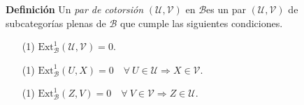 \documentclass[preview]{standalone}
\begin{document}
\begin{center}
\justifying \textbf{Definición} Un \emph{par de cotorsión} $(\mathcal{U}, \mathcal{V})$ en $\mathscr{B}$es un par $(\mathcal{U}, \mathcal{V})$ de subcategorías plenas de $\mathscr{B}$ que cumple las siguientes condiciones.\begin{enumerate} \item[(1)] $\text{Ext}^1_\mathscr{B} (\mathcal{U}, \mathcal{V}) = 0$. \item[(1)] $\text{Ext}^1_\mathscr{B} (U, X) = 0 \quad \forall \ U\in\mathcal{U} \Rightarrow X\in\mathcal{V}$. \item[(1)] $\text{Ext}^1_\mathscr{B} (Z, V) = 0 \quad \forall \ V\in\mathcal{V} \Rightarrow Z\in\mathcal{U}$. \end{enumerate}
\end{center}
\end{document}

